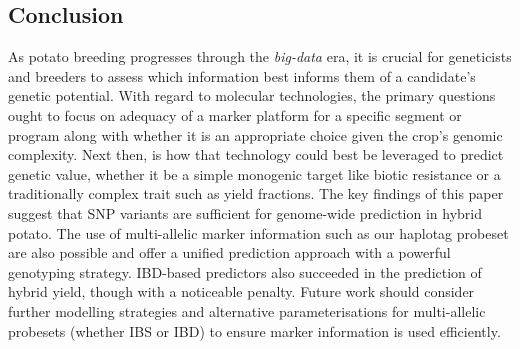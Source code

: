 \begin{refsection}
\section{Conclusion}\label{conclusion}

As potato breeding progresses through the \emph{big-data} era, it is
crucial for geneticists and breeders to assess which information best
informs them of a candidate's genetic potential. With regard to
molecular technologies, the primary questions ought to focus on adequacy
of a marker platform for a specific segment or program along with
whether it is an appropriate choice given the crop's genomic complexity.
Next then, is how that technology could best be leveraged to predict
genetic value, whether it be a simple monogenic target like biotic
resistance or a traditionally complex trait such as yield fractions. The
key findings of this paper suggest that SNP variants are sufficient for
genome-wide prediction in hybrid potato. The use of multi-allelic marker
information such as our haplotag probeset are also possible and offer a
unified prediction approach with a powerful genotyping strategy.
IBD-based predictors also succeeded in the prediction of hybrid yield,
though with a noticeable penalty. Future work should consider further
modelling strategies and alternative parameterisations for multi-allelic
probesets (whether IBS or IBD) to ensure marker information is used
efficiently.

\printbibliography[heading=chapterbib, resetnumbers=true]

\end{refsection}

